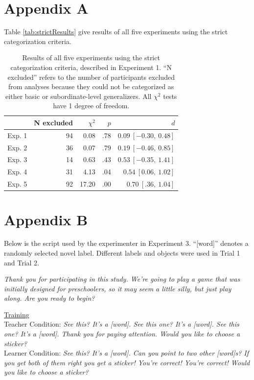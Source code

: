 \documentclass[man]{apa2}
\begin{document}
\section{Appendix A}

Table \ref{tab:strictResults} give results of all five experiments using the strict categorization criteria.

\begin{table}[h]
\centering
\begin{tabular}{rrrrr}
 \hline
 & N excluded & $\chi^2$ & $p$ & $d$ \\ 
 \hline
Exp. 1 & 94 & 0.08 & .78 & $0.09\ [-0.30,\ 0.48]$\\ 
Exp. 2 & 36 & 0.07 & .79 & $0.19\ [-0.46,\ 0.85]$ \\ 
Exp. 3 & 14 & 0.63 & .43 & $0.53\ [-0.35,\ 1.41]$ \\ 
Exp. 4 & 31 & 4.13 & .04 & $0.54\ [0.06,\ 1.02]$\\ 
Exp. 5 & 92 & 17.20 &  .00 & $0.70\ [.36,\ 1.04]$\\ 
 \hline
\end{tabular}
\caption{Results of all five experiments using the strict categorization criteria, described in Experiment 1. ``N excluded'' refers to the number of participants excluded from analyses because they could not be categorized as either basic or subordinate-level generalizers. All $\chi^2$ tests have 1 degree of freedom. }
\label{strictResults}
\end{table}


\section{Appendix B}
Below is the script used by the experimenter in Experiment 3. ``[word]'' denotes a randomly selected novel label. Different labels and objects were used in Trial 1 and Trial 2. 

\vspace{5mm}

{\it Thank you for participating in this study. We're going to play a game that was initially designed for preschoolers, so it may seem a little silly, but just play along. Are you ready to begin?}
\vspace{2.5mm}

\noindent \underline{Training} \\
	Teacher Condition: {\it See this? It's a [word]. See this one? It's a [word]. See this one? It's a [word]. Thank you for paying attention. Would you like to choose a sticker? }
\\
Learner Condition: {\it See this? It's a [word]. Can you point to two other [word]s? If you get both of them right you get a sticker! You're correct! You're correct! Would you like to choose a sticker? }
\vspace{2.5mm}
 
\end{document}
